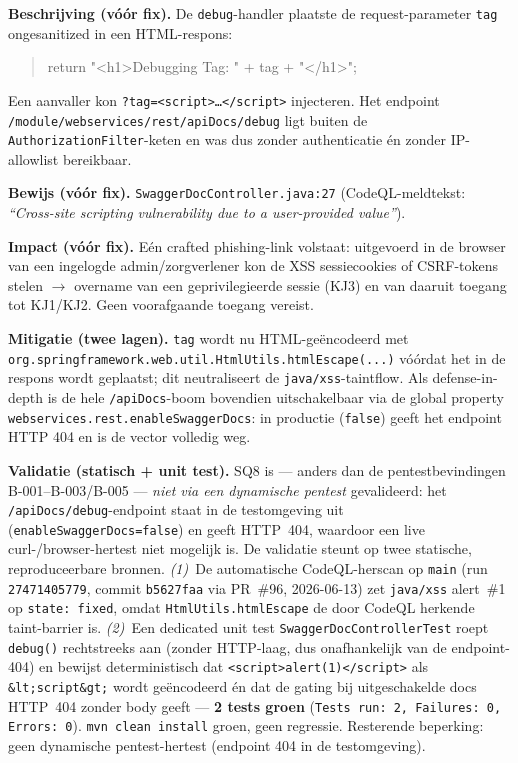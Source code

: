 \documentclass[12pt, a4paper]{report}
\begin{document}
\textbf{Beschrijving (vóór fix).} De \texttt{debug}-handler plaatste de
request-parameter \texttt{tag} ongesanitized in een HTML-respons:
\begin{quote}\ttfamily\small return "<h1>Debugging Tag: " + tag + "</h1>";\end{quote}
Een aanvaller kon \texttt{?tag=<script>\ldots</script>} injecteren. Het endpoint
\texttt{/module/\allowbreak webservices/\allowbreak rest/\allowbreak apiDocs/\allowbreak debug}
ligt buiten de \texttt{AuthorizationFilter}-keten en was dus zonder authenticatie
én zonder IP-allowlist bereikbaar.

\textbf{Bewijs (vóór fix).} \texttt{SwaggerDocController.java:27} (CodeQL-meldtekst:
\emph{``Cross-site scripting vulnerability due to a user-provided value''}).

\textbf{Impact (vóór fix).} Eén crafted phishing-link volstaat: uitgevoerd in de
browser van een ingelogde admin/zorgverlener kon de XSS sessiecookies of
CSRF-tokens stelen $\to$ overname van een geprivilegieerde sessie (KJ3) en van
daaruit toegang tot KJ1/KJ2. Geen voorafgaande toegang vereist.

\textbf{Mitigatie (twee lagen).} \texttt{tag} wordt nu HTML-geëncodeerd met
\texttt{org.springframework.web.util.HtmlUtils.htmlEscape(...)} vóórdat het in
de respons wordt geplaatst; dit neutraliseert de \texttt{java/xss}-taintflow.
Als defense-in-depth is de hele \texttt{/apiDocs}-boom bovendien uitschakelbaar
via de global property \texttt{webservices.rest.enableSwaggerDocs}: in productie
(\texttt{false}) geeft het endpoint HTTP 404 en is de vector volledig weg.

\textbf{Validatie (statisch + unit test).} SQ8 is --- anders dan de
pentestbevindingen B-001--B-003/B-005 --- \emph{niet via een dynamische pentest}
gevalideerd: het \texttt{/apiDocs/debug}-endpoint staat in de testomgeving uit
(\texttt{enableSwaggerDocs=false}) en geeft HTTP~404, waardoor een live
curl-/browser-hertest niet mogelijk is. De validatie steunt op twee statische,
reproduceerbare bronnen. \emph{(1)}~De automatische CodeQL-herscan op \texttt{main}
(run \texttt{27471405779}, commit \texttt{b5627faa} via PR~\#96, 2026-06-13) zet
\texttt{java/xss} alert~\#1 op \texttt{state: fixed}, omdat \texttt{HtmlUtils.htmlEscape}
de door CodeQL herkende taint-barrier is. \emph{(2)}~Een dedicated unit test
\texttt{SwaggerDocControllerTest} roept \texttt{debug()} rechtstreeks aan (zonder
HTTP-laag, dus onafhankelijk van de endpoint-404) en bewijst deterministisch dat
\texttt{<script>alert(1)</script>} als \texttt{\&lt;script\&gt;} wordt geëncodeerd én dat
de gating bij uitgeschakelde docs HTTP~404 zonder body geeft --- \textbf{2 tests groen}
(\texttt{Tests run: 2, Failures: 0, Errors: 0}). \texttt{mvn clean install} groen, geen
regressie. Resterende beperking: geen dynamische pentest-hertest (endpoint 404 in de
testomgeving).
\end{document}
